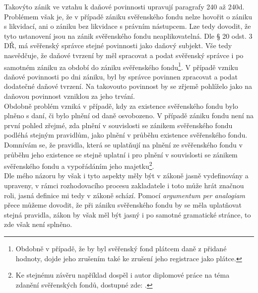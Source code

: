 \documentclass{article}
\begin{document}
Takovýto zánik ve vztahu k daňové povinnosti upravují paragrafy 240 až 240d. Problémem však je, že v případě zániku svěřenského fondu nelze hovořit o zániku s likvidací, ani o zániku bez likvidace s právním nástupcem. Lze tedy dovodit, že tyto ustanovení jsou na zánik svěřenského fondu neaplikovatelná. Dle § 20 odst. 3 DŘ, má svěřenský správce stejné povinnosti jako daňový subjekt. Vše tedy nasvědčuje, že daňové tvrzení by měl spracovat a podat svěřenský správce i po samotném zániku za období do zániku svěřenského fondu\footnote{Obdobně v případě, že by byl svěřenský fond plátcem daně z přidané hodnoty, dojde jeho zrušením také ke zrušení jeho registrace jako plátce.}. V případě vzniku daňové povinnosti po dni zániku, byl by správce povinnen zpracovat a podat dodatečné daňové tvrzení. Na takovouto povinnost by se zřjemě pohlíželo jako na daňovou povinnost vzniklou za jeho trvání.\\

Obdobně problém vzniká v případě, kdy za existence svěřenského fondu bylo plněno s daní, či bylo plnění od daně osvobozeno. V případě zániku fondu není na první pohled zřejmé, zda plnění v souvislosti se zánikem svěřenského fondu podléhá stejným pravidlům, jako plnění v průběhu existence svěřenského fondu.\\

Domnívám se, že pravidla, která se uplatňují na plnění ze svěřenského fondu v průběhu jeho existence se stejně uplatní i pro plnění v souvislosti se zánikem svěřenského fondu a vypořádáním jeho majetku\footnote{Ke stejnému závěru například dospěl i autor diplomové práce na téma zdanění svěřenských fondů, dostupné zde: .}.\\

Dle mého názoru by však i tyto aspekty měly být v zákoně jasně vydefinovány a upraveny, v rámci rozhodovacího procesu zakladatele i toto může hrát značnou roli, jasná definice mi tedy v zákoně schází. Pomocí \textit{argumentum per analogiam} přece můžeme dovodit, že při zániku svěřenského fondu by se měla uplatňovat stejná pravidla, zákon by však měl být jasný i po samotné gramatické stránce, to zde však není splněno.\\



 
\end{document}
